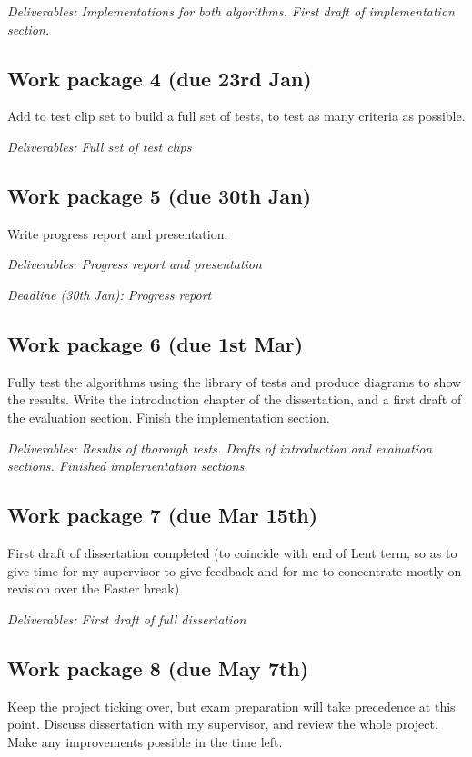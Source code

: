 \documentclass[12pt]{article}
\begin{document}
\emph{Deliverables: Implementations for both algorithms. First draft of implementation section.}

\subsection*{Work package 4 (due 23rd Jan)}
Add to test clip set to build a full set of tests, to test as many criteria as possible.

\emph{Deliverables: Full set of test clips}

\subsection*{Work package 5 (due 30th Jan)}
Write progress report and presentation.

\emph{Deliverables: Progress report and presentation}

\emph{Deadline (30th Jan): Progress report}

\subsection*{Work package 6 (due 1st Mar)}
Fully test the algorithms using the library of tests and produce diagrams to show the results. Write the introduction chapter of the dissertation, and a first draft of the evaluation section. Finish the implementation section.

\emph{Deliverables: Results of thorough tests. Drafts of introduction and evaluation sections. Finished implementation sections.}

\subsection*{Work package 7 (due Mar 15th)}
First draft of dissertation completed (to coincide with end of Lent term, so as to give time for my supervisor to give feedback and for me to concentrate mostly on revision over the Easter break).

\emph{Deliverables: First draft of full dissertation}

\subsection*{Work package 8 (due May 7th)}
Keep the project ticking over, but exam preparation will take precedence at this point. Discuss dissertation with my supervisor, and review the whole project. Make any improvements possible in the time left.
\end{document}
